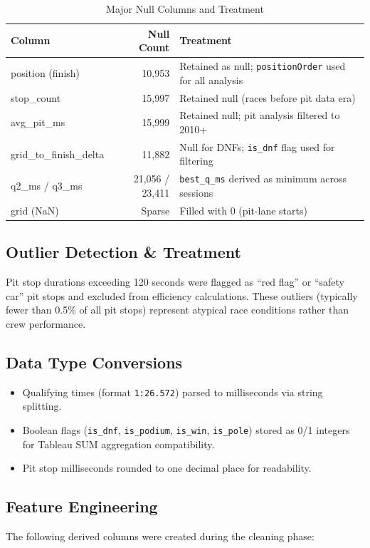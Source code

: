 \documentclass[12pt, a4paper]{article}
\begin{document}
\begin{table}[H]
\centering
\caption{Major Null Columns and Treatment}
\begin{tabular}{l r l}
\toprule
\textbf{Column} & \textbf{Null Count} & \textbf{Treatment} \\
\midrule
position (finish)       & 10,953 & Retained as null; \texttt{positionOrder} used for all analysis \\
stop\_count             & 15,997 & Retained null (races before pit data era) \\
avg\_pit\_ms            & 15,999 & Retained null; pit analysis filtered to 2010+ \\
grid\_to\_finish\_delta & 11,882 & Null for DNFs; \texttt{is\_dnf} flag used for filtering \\
q2\_ms / q3\_ms         & 21,056 / 23,411 & \texttt{best\_q\_ms} derived as minimum across sessions \\
grid (NaN)              & Sparse & Filled with 0 (pit-lane starts) \\
\bottomrule
\end{tabular}
\end{table}

\subsection{Outlier Detection \& Treatment}
Pit stop durations exceeding 120 seconds were flagged as ``red flag'' or ``safety car'' pit stops and excluded from efficiency calculations. These outliers (typically fewer than 0.5\% of all pit stops) represent atypical race conditions rather than crew performance.

\subsection{Data Type Conversions}
\begin{itemize}[noitemsep]
    \item Qualifying times (format \texttt{1:26.572}) parsed to milliseconds via string splitting.
    \item Boolean flags (\texttt{is\_dnf}, \texttt{is\_podium}, \texttt{is\_win}, \texttt{is\_pole}) stored as 0/1 integers for Tableau SUM aggregation compatibility.
    \item Pit stop milliseconds rounded to one decimal place for readability.
\end{itemize}

\subsection{Feature Engineering}
The following derived columns were created during the cleaning phase:
\end{document}
